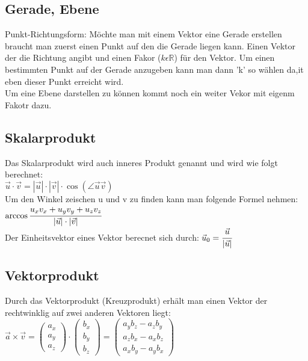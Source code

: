 \documentclass[a4paper,10pt]{scrartcl}
\begin{document}
        \subsection{Gerade, Ebene}
            Punkt-Richtungsform: Möchte man mit einem Vektor eine Gerade erstellen braucht man zuerst einen Punkt auf den die Gerade liegen kann. Einen Vektor der die Richtung angibt 
            und einen Fakor ($k \epsilon \mathbb{R}$) für den Vektor. Um einen bestimmten Punkt auf der Gerade anzugeben kann man dann 'k' so wählen da,it eben dieser Punkt erreicht wird.\\
            Um eine Ebene darstellen zu können kommt noch ein weiter Vekor mit eigenm Fakotr dazu.  

        \subsection{Skalarprodukt}
            Das Skalarprodukt wird auch inneres Produkt genannt und wird wie folgt berechnet: \\
            $\vec{u} \cdot \vec{v} = |\vec{u}| \cdot |\vec{v}| \cdot \cos(\angle \vec{u} \vec{v})$ \\
            Um den Winkel zeischen u und v zu finden kann man folgende Formel nehmen: $\arccos \cfrac{u_xv_x + u_yv_y + u_zv_z}{|\vec{u}|\cdot|\vec{v}|}$ \\
            Der Einheitsvektor eines Vektor berecnet sich durch: $\vec{u}_0 = \cfrac{\vec{u}}{|\vec{u}|}$
        \subsection{Vektorprodukt}
            Durch das Vektorprodukt (Kreuzprodukt) erhält man einen Vektor der rechtwinklig auf zwei anderen Vektoren liegt:\\
            $\vec{a} \times \vec{v} = 
            \begin{pmatrix}
                a_x\\
                a_y\\
                a_z
            \end{pmatrix} \cdot
            \begin{pmatrix}
                b_x\\
                b_y\\
                b_z
            \end{pmatrix}
            = \begin{pmatrix}
                a_yb_z - a_zb_y\\
                a_zb_x - a_xb_z\\
                a_xb_y - a_yb_x
            \end{pmatrix}$
    
\end{document}
